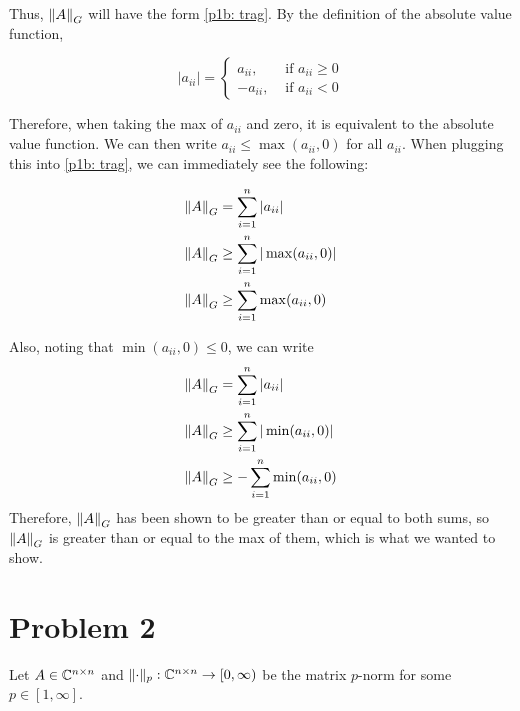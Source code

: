 \begin{solution}
    Thus, $\norm{A}_G$ will have the form \ref{p1b: trag}. By the definition of the absolute value function,

    \[
    |a_{ii}| = 
    \begin{cases}
     a_{ii}, &\text{ if } a_{ii} \geq 0 \\
    -a_{ii}, &\text{ if } a_{ii} < 0
    \end{cases}
    \]

    Therefore, when taking the max of $a_{ii}$ and zero, it is equivalent to the absolute value function. We can then write $a_{ii} \leq \max(a_{ii}, 0)$ for all $a_{ii}$. When plugging this into \ref{p1b: trag}, we can immediately see the following:
    
    \newpage
    \alignbreak
    \begin{align}
        \norm{A}_G &= \sum_{i = 1}^n |a_{ii}|\nonumber\\
        \norm{A}_G &\geq \sum_{i = 1}^n |\max(a_{ii}, 0)|\nonumber\\
        \norm{A}_G &\geq \sum_{i = 1}^n \max(a_{ii}, 0)\nonumber
    \end{align}

    Also, noting that $\min(a_{ii}, 0) \leq 0$, we can write
        \begin{align}
        \norm{A}_G &= \sum_{i = 1}^n |a_{ii}|\nonumber\\
        \norm{A}_G &\geq \sum_{i = 1}^n |\min(a_{ii}, 0)|\nonumber\\
        \norm{A}_G &\geq -\sum_{i = 1}^n \min(a_{ii}, 0)\nonumber
    \end{align}
    \alignbreak
    Therefore, $\norm{A}_G$ has been shown to be greater than or equal to both sums, so $\norm{A}_G$ is greater than or equal to the max of them, which is what we wanted to show. 
\end{solution}
\newpage
\section{Problem 2}
Let $A \in \mathbb{C}^{n\times n}$ and $\lVert \cdot \rVert_p : \mathbb{C}^{n \times n} \rightarrow [0, \infty )$ be the matrix $p$-norm for some $p \in [1, \infty]$. 

